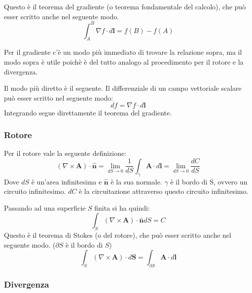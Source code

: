 \documentclass{article}
\newcommand{\mbf}{\mathbf}
\newcommand{\vers}[1]{\mbf{\hat #1 }}
\numberwithin{equation}{section}
\begin{document}
Questo è il teorema del gradiente (o teorema fondamentale del calcolo), che può esser scritto anche nel seguente modo.
\begin{equation}
    \int_A^B \nabla f \cdot d \mbf l = f(B) - f(A)
\end{equation}

Per il gradiente c'è un modo più immediato di trovare la relazione sopra, ma il modo sopra è utile poichè è del tutto analogo al procedimento per il rotore e la divergenza.

Il modo più diretto è il seguente. Il differenziale di un campo vettoriale scalare può esser scritto nel seguente modo:
\begin{equation}
    df = \nabla f \cdot d \mbf l
\end{equation}
Integrando segue direttamente il teorema del gradiente.


\subsubsection{Rotore} %
\label{ssub:rotore}

Per il rotore vale la seguente definizione:
\begin{equation} \label{eq:rot_def}
    ( \nabla \times \mbf A ) \cdot \vers n 
        = \lim_{ dS \to 0 } \frac{ 1 }{ dS }  \int_\gamma \mbf A \cdot d \mbf l 
        = \lim_{ dS \to 0 } \frac{ dC }{ dS }
\end{equation}
Dove $dS$ è un'area infinitesima e $\vers n$ è la sua normale. $\gamma$ è il bordo di S, ovvero un circuito infinitesimo. $dC$ è la circuitazione attraverso questo circuito infinitesimo.

Passando ad una superficie $S$ finita si ha quindi:
\begin{equation*}
    \int_S ( \nabla \times \mbf A ) \cdot \vers n dS = C
\end{equation*}
Questo è il teorema di Stokes (o del rotore), che può esser scritto anche nel seguente modo. ($\partial S$ è il bordo di $S$)
\begin{equation}
    \int_S ( \nabla \times \mbf A ) \cdot d \mbf S = \int_{\partial S} \mbf A \cdot d \mbf l
\end{equation}



\subsubsection{Divergenza} %
\label{ssub:divergenza}
\end{document}

